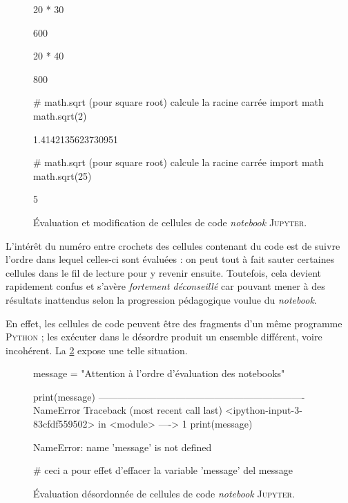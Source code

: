 \begin{figure}
\begin{nbjupyterin}{1}
20 * 30
\end{nbjupyterin}
\begin{nbjupyterout}{1}
600
\end{nbjupyterout}
\begin{nbjupyterin}{1}
20 * 40
\end{nbjupyterin}
\begin{nbjupyterout}{1}
800
\end{nbjupyterout}
\begin{nbjupyterin}{2}
# math.sqrt (pour square root) calcule la racine carrée
import math
math.sqrt(2)
\end{nbjupyterin}
\begin{nbjupyterout}{2}
1.4142135623730951
\end{nbjupyterout}
\begin{nbjupyterin}{2}
# math.sqrt (pour square root) calcule la racine carrée
import math
math.sqrt(25)
\end{nbjupyterin}
\begin{nbjupyterout}{2}
5
\end{nbjupyterout}
\caption{\label{fig:X.4}Évaluation et modification de cellules de code \emph{notebook} \textsc{Jupyter}.}
\end{figure}


L'intérêt du numéro entre crochets des cellules contenant du code est de suivre l'ordre dans lequel celles-ci sont évaluées : on peut tout à fait sauter certaines cellules dans le fil de lecture pour y revenir ensuite. Toutefois, cela devient rapidement confus et s'avère \emph{fortement déconseillé} car pouvant mener à des résultats inattendus selon la progression pédagogique voulue du \textit{notebook}. 

En effet, les cellules de code peuvent être des fragments d'un même programme \textsc{Python} ; les exécuter dans le désordre produit un ensemble différent, voire incohérent. La \cref{fig:X.5} expose une telle situation.

\begin{figure}
\begin{nbjupyterin}{1}
message = "Attention à l'ordre d'évaluation des notebooks"
\end{nbjupyterin}
\vspace*{1pt}
\begin{nbjupyterin}{3}
print(message)
----------------------------------------------------------------
NameError                      Traceback (most recent call last)
<ipython-input-3-83cfdf559502> in <module>
----> 1 print(message)

NameError: name 'message' is not defined
\end{nbjupyterin}
\vspace*{1pt}
\begin{nbjupyterin}{2}
# ceci a pour effet d'effacer la variable 'message'
del message
\end{nbjupyterin}
\caption{\label{fig:X.5}Évaluation désordonnée de cellules de code \emph{notebook} \textsc{Jupyter}.}
\end{figure}

